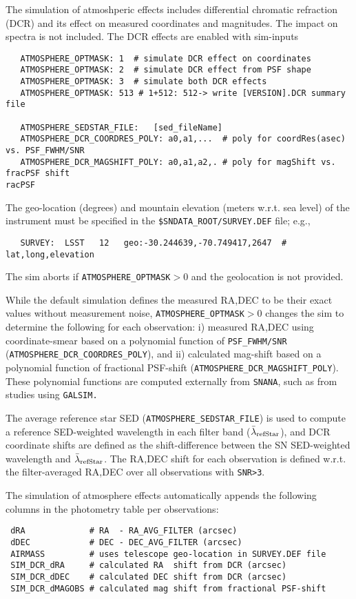 \documentclass[12pt]{article}
\newcommand{\snana}{{\tt SNANA}}
\begin{document}
The simulation of atmoshperic effects includes 
differential chromatic refraction (DCR)
and its effect on measured coordinates and magnitudes. The impact on spectra
is not included. The DCR effects are enabled with sim-inputs
 \begin{verbatim}
   ATMOSPHERE_OPTMASK: 1  # simulate DCR effect on coordinates
   ATMOSPHERE_OPTMASK: 2  # simulate DCR effect from PSF shape
   ATMOSPHERE_OPTMASK: 3  # simulate both DCR effects
   ATMOSPHERE_OPTMASK: 513 # 1+512: 512-> write [VERSION].DCR summary file

   ATMOSPHERE_SEDSTAR_FILE:   [sed_fileName]
   ATMOSPHERE_DCR_COORDRES_POLY: a0,a1,...  # poly for coordRes(asec) vs. PSF_FWHM/SNR
   ATMOSPHERE_DCR_MAGSHIFT_POLY: a0,a1,a2,. # poly for magShift vs. fracPSF shift
racPSF
\end{verbatim}
%
The geo-location (degrees) and mountain elevation (meters w.r.t. sea level) 
of the instrument must be specified 
in the {\tt \$SNDATA\_ROOT/SURVEY.DEF} file; e.g., 
\begin{verbatim}
   SURVEY:  LSST   12   geo:-30.244639,-70.749417,2647  # lat,long,elevation
\end{verbatim}
The sim aborts if {\tt ATMOSPHERE\_OPTMASK}$>0$ 
and the geolocation is not provided.


While the default simulation defines the measured RA,DEC to be their exact values
without measurement noise, {\tt ATMOSPHERE\_OPTMASK}$>0$ changes the sim
to determine the following for each observation:
i) measured RA,DEC using coordinate-smear based on a polynomial function of 
{\tt PSF\_FWHM/SNR} ({\tt ATMOSPHERE\_DCR\_COORDRES\_POLY}),  and 
ii) calculated mag-shift based on a polynomial function of fractional PSF-shift
({\tt ATMOSPHERE\_DCR\_MAGSHIFT\_POLY}).
These polynomial functions are computed externally from \snana,
such as from studies using {\tt GALSIM.}


\newcommand{\lamrefStar}{$\bar{\lambda}_{\rm refStar}$}
The average reference star SED ({\tt ATMOSPHERE\_SEDSTAR\_FILE}) is used to
compute a reference SED-weighted wavelength in each filter band (\lamrefStar), 
and DCR coordinate shifts are defined as the shift-difference between 
the SN SED-weighted wavelength and \lamrefStar.
The RA,DEC shift for each observation is defined w.r.t.
the filter-averaged RA,DEC over all observations with {\tt SNR>3}.

The simulation of atmosphere effects automatically appends the following
columns in the photometry table per observations:
\begin{verbatim}
 dRA             # RA  - RA_AVG_FILTER (arcsec)
 dDEC            # DEC - DEC_AVG_FILTER (arcsec)
 AIRMASS         # uses telescope geo-location in SURVEY.DEF file
 SIM_DCR_dRA     # calculated RA  shift from DCR (arcsec)
 SIM_DCR_dDEC    # calculated DEC shift from DCR (arcsec)
 SIM_DCR_dMAGOBS # calculated mag shift from fractional PSF-shift
\end{verbatim}
%
\end{document}
